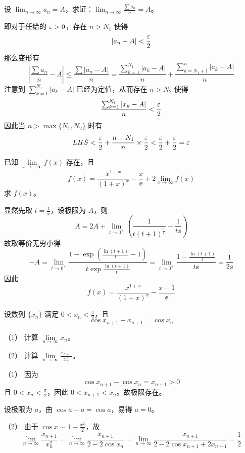 \begin{problem}[000007]
设 $\displaystyle\lim_{n\to\infty}a_n=A$，求证：$\displaystyle\lim_{n\to\infty}\frac{\sum a_n}{n}=A$。
\end{problem}

\begin{solution}
	即对于任给的 $\varepsilon>0$，存在 $n>N_1$ 使得
	\[ |a_n-A|<\dfrac{\varepsilon}{2}\]
	那么变形有
	\[ \left|\frac{\sum a_n}{n}-A\right| \leqslant \frac{\sum |a_n-A|}{n} = \frac{\sum_{k=1}^{N_1} |a_k-A|}{n} + \frac{\sum_{k=N_1+1}^{n} |a_k-A|}{n}\]
	注意到 $\sum_{k=1}^{N_1} |a_k-A|$ 已经为定值，从而存在 $n>N_2$ 使得
	\[ \frac{\sum_{k=1}^{N_1}|x_k-A|}{n}<\frac{\varepsilon}{2}\]
	因此当 $n>\max\{N_1,N_2\}$ 时有
	\[ LHS < \frac{\varepsilon}{2}+\frac{n-N_1}{n}\times \frac{\varepsilon}{2} < \frac{\varepsilon}{2}+\frac{\varepsilon}{2} = \varepsilon \]
\end{solution}

\begin{problem}[000017]
已知 $\lim\limits_{x \to +\infty} f(x)$ 存在，且
\[ f(x) = \frac{x^{1+x}}{(1+x)^x} - \frac{x}{\ee} + 2 \lim_{x \to \infty} f(x) \]
求 $f(x)$。
\end{problem}

\begin{solution}
	显然先取 $t = \frac{1}{x}$，设极限为 $A$，则
	\[ A = 2A + \lim_{t \to 0^+} \left( \frac{1}{t (t+1)^{\frac{1}{t}}} - \frac{1}{t \ee} \right) \]
	故取等价无穷小得
	\[ -A = \lim_{t \to 0^+} \frac{1 - \exp\left( \frac{\ln(t + 1)}{t} - 1\right)}{t \exp\frac{\ln(t + 1)}{t}} = \lim_{t \to 0^+} \frac{1 - \frac{\ln(t + 1)}{t}}{t \ee} = \frac{1}{2 \ee} \]
	因此
	\[ f(x) = \frac{x^{1+x}}{(1+x)^x} - \frac{x + 1}{\ee} \]
\end{solution}

\begin{problem}[000019]
设数列 $\{x_n\}$ 满足 $0 < x_n < \frac{\pi}{2}$，且
\[ \cos x_{n+1} - x_{n+1} = \cos x_n \]

（1） 计算 $\lim\limits_{n \to \infty} x_n$。

（2） 计算 $\lim\limits_{n \to \infty} \frac{x_{n+1}}{x_n^2}$。

\end{problem}

\begin{solution}
	（1） 因为
	\[ \cos x_{n+1} - \cos x_n = x_{n+1} > 0 \]
	且 $0 < x_n < \frac{\pi}{2}$，因此 $0 < x_{n+1} < x_n$。故极限存在。

	设极限为 $a$，由 $\cos a - a = \cos a$，易得 $a = 0$。

	（2） 由于 $\cos x \sim 1 - \frac{x^2}{2}$，故
	\[ \lim_{n \to \infty} \frac{x_{n+1}}{x_n^2} = \lim_{n \to \infty} \frac{x_{n+1}}{2 - 2 \cos x_{n}} = \lim_{n \to \infty} \frac{x_{n+1}}{2 - 2 \cos x_{n+1} + 2x_{n+1}} = \frac{1}{2} \]
\end{solution}

